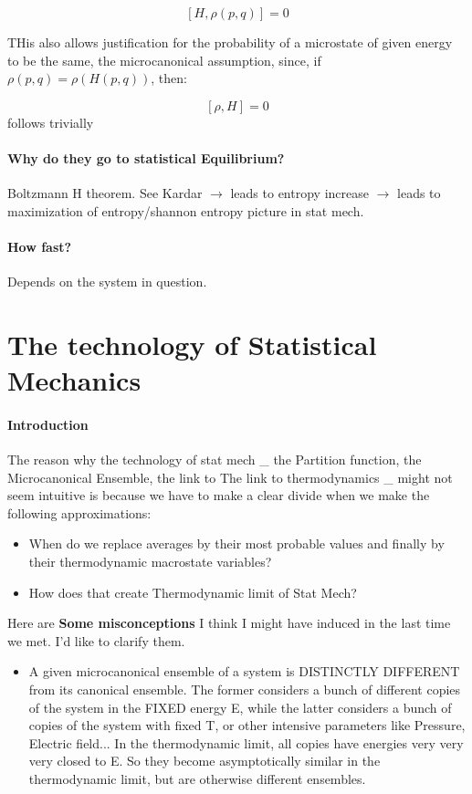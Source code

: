 $$[H, \rho(p,q)]= 0$$

THis also allows justification for the probability of a microstate of given energy to be the same, the microcanonical assumption, since, if $\rho(p,q)= \rho(H(p,q))$, then:

$$[\rho, H] = 0$$ follows trivially


\paragraph{Why do they go to statistical Equilibrium?}

Boltzmann H theorem.  See Kardar $\rightarrow$ leads to entropy increase $\rightarrow$ leads to maximization of entropy/shannon entropy picture in stat mech.

\paragraph{How fast?}

Depends on the system in question.

\section{The technology of Statistical Mechanics}

\paragraph{Introduction}

The reason why the technology of stat mech \_ the Partition function, the Microcanonical Ensemble, the link to The link to thermodynamics \_ might not seem intuitive is because we have to make a clear divide when we make the following approximations:

\begin{itemize}
\item When do we replace averages by their most probable values and finally by their thermodynamic macrostate variables?
\item  How does that create Thermodynamic limit of Stat Mech?
\end{itemize}
Here are {\bf Some misconceptions}  I think I might have induced in the last time we met.  I'd like to clarify them.

\begin{itemize}
\item A given microcanonical ensemble of a system is DISTINCTLY DIFFERENT from its canonical ensemble.  The former considers a bunch of different copies of the system in the FIXED energy E, while the latter considers a bunch of copies of the system with fixed T, or other intensive parameters like Pressure, Electric field... In the thermodynamic limit, all copies have energies very very very closed to E.  So they become asymptotically similar in the thermodynamic limit, but are otherwise different ensembles.
\end{itemize}

